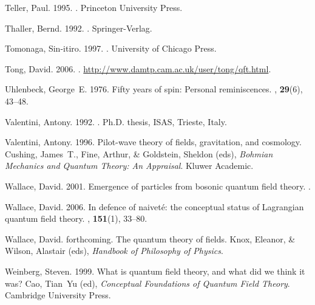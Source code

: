 \documentclass[12pt,secnumarabic,amsmath,amssymb,balancelastpage,nofootinbib]{article}
\begin{document}
\begin{thebibliography}{}
Teller, Paul. 1995.
.
\newblock Princeton University Press.

Thaller, Bernd. 1992.
.
\newblock Springer-Verlag.

Tomonaga, Sin-itiro. 1997.
.
\newblock University of Chicago Press.

Tong, David. 2006.
.
\newblock \url{http://www.damtp.cam.ac.uk/user/tong/qft.html}.

Uhlenbeck, George~E. 1976.
\newblock Fifty years of spin: Personal reminiscences.
, {\bf 29}(6), 43--48.

Valentini, Antony. 1992.
.
\newblock Ph.D. thesis, ISAS, Trieste, Italy.

Valentini, Antony. 1996.
\newblock Pilot-wave theory of fields, gravitation, and cosmology.
 Cushing, James~T., Fine, Arthur, \&
  Goldstein, Sheldon (eds), {\em Bohmian Mechanics and Quantum Theory: An
  Appraisal}.
\newblock Kluwer Academic.

Wallace, David. 2001.
\newblock Emergence of particles from bosonic quantum field theory.
.

Wallace, David. 2006.
\newblock In defence of naivet\'{e}: the conceptual status of Lagrangian
  quantum field theory.
, {\bf 151}(1), 33--80.

Wallace, David. forthcoming.
\newblock The quantum theory of fields.
 Knox, Eleanor, \& Wilson, Alastair (eds), {\em Handbook of
  Philosophy of Physics}.

Weinberg, Steven. 1999.
\newblock What is quantum field theory, and what did we think it was?
 Cao, Tian~Yu (ed), {\em Conceptual
  Foundations of Quantum Field Theory}.
\newblock Cambridge University Press.


\end{thebibliography}
\end{document}
